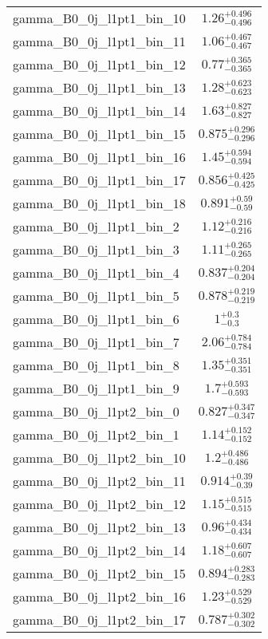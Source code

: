 \begin{tabular}{|l|c|}
gamma\_B0\_0j\_l1pt1\_bin\_10 & $1.26^{+0.496}_{-0.496}$ \\
gamma\_B0\_0j\_l1pt1\_bin\_11 & $1.06^{+0.467}_{-0.467}$ \\
gamma\_B0\_0j\_l1pt1\_bin\_12 & $0.77^{+0.365}_{-0.365}$ \\
gamma\_B0\_0j\_l1pt1\_bin\_13 & $1.28^{+0.623}_{-0.623}$ \\
gamma\_B0\_0j\_l1pt1\_bin\_14 & $1.63^{+0.827}_{-0.827}$ \\
gamma\_B0\_0j\_l1pt1\_bin\_15 & $0.875^{+0.296}_{-0.296}$ \\
gamma\_B0\_0j\_l1pt1\_bin\_16 & $1.45^{+0.594}_{-0.594}$ \\
gamma\_B0\_0j\_l1pt1\_bin\_17 & $0.856^{+0.425}_{-0.425}$ \\
gamma\_B0\_0j\_l1pt1\_bin\_18 & $0.891^{+0.59}_{-0.59}$ \\
gamma\_B0\_0j\_l1pt1\_bin\_2 & $1.12^{+0.216}_{-0.216}$ \\
gamma\_B0\_0j\_l1pt1\_bin\_3 & $1.11^{+0.265}_{-0.265}$ \\
gamma\_B0\_0j\_l1pt1\_bin\_4 & $0.837^{+0.204}_{-0.204}$ \\
gamma\_B0\_0j\_l1pt1\_bin\_5 & $0.878^{+0.219}_{-0.219}$ \\
gamma\_B0\_0j\_l1pt1\_bin\_6 & $1^{+0.3}_{-0.3}$ \\
gamma\_B0\_0j\_l1pt1\_bin\_7 & $2.06^{+0.784}_{-0.784}$ \\
gamma\_B0\_0j\_l1pt1\_bin\_8 & $1.35^{+0.351}_{-0.351}$ \\
gamma\_B0\_0j\_l1pt1\_bin\_9 & $1.7^{+0.593}_{-0.593}$ \\
gamma\_B0\_0j\_l1pt2\_bin\_0 & $0.827^{+0.347}_{-0.347}$ \\
gamma\_B0\_0j\_l1pt2\_bin\_1 & $1.14^{+0.152}_{-0.152}$ \\
gamma\_B0\_0j\_l1pt2\_bin\_10 & $1.2^{+0.486}_{-0.486}$ \\
gamma\_B0\_0j\_l1pt2\_bin\_11 & $0.914^{+0.39}_{-0.39}$ \\
gamma\_B0\_0j\_l1pt2\_bin\_12 & $1.15^{+0.515}_{-0.515}$ \\
gamma\_B0\_0j\_l1pt2\_bin\_13 & $0.96^{+0.434}_{-0.434}$ \\
gamma\_B0\_0j\_l1pt2\_bin\_14 & $1.18^{+0.607}_{-0.607}$ \\
gamma\_B0\_0j\_l1pt2\_bin\_15 & $0.894^{+0.283}_{-0.283}$ \\
gamma\_B0\_0j\_l1pt2\_bin\_16 & $1.23^{+0.529}_{-0.529}$ \\
gamma\_B0\_0j\_l1pt2\_bin\_17 & $0.787^{+0.302}_{-0.302}$ \\

\end{tabular}

